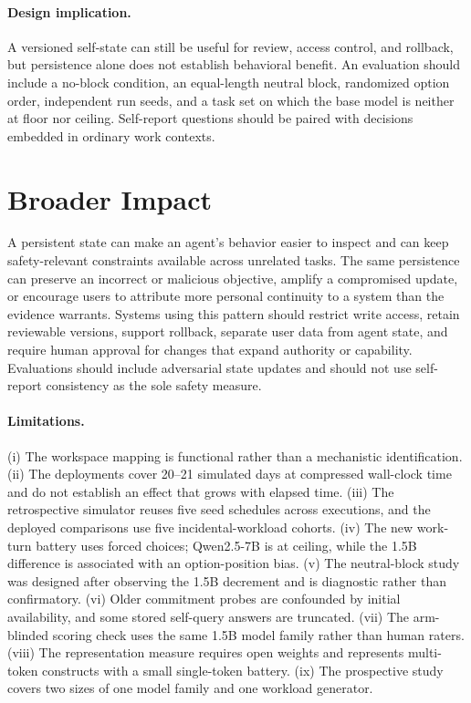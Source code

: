 \documentclass[11pt]{article}
\begin{document}
\paragraph{Design implication.} A versioned self-state can still be useful for review, access control, and rollback, but persistence alone does not establish behavioral benefit. An evaluation should include a no-block condition, an equal-length neutral block, randomized option order, independent run seeds, and a task set on which the base model is neither at floor nor ceiling. Self-report questions should be paired with decisions embedded in ordinary work contexts.

\section*{Broader Impact}
A persistent state can make an agent's behavior easier to inspect and can keep safety-relevant constraints available across unrelated tasks. The same persistence can preserve an incorrect or malicious objective, amplify a compromised update, or encourage users to attribute more personal continuity to a system than the evidence warrants. Systems using this pattern should restrict write access, retain reviewable versions, support rollback, separate user data from agent state, and require human approval for changes that expand authority or capability. Evaluations should include adversarial state updates and should not use self-report consistency as the sole safety measure.

\paragraph{Limitations.} (i) The workspace mapping is functional rather than a mechanistic identification. (ii) The deployments cover 20--21 simulated days at compressed wall-clock time and do not establish an effect that grows with elapsed time. (iii) The retrospective simulator reuses five seed schedules across executions, and the deployed comparisons use five incidental-workload cohorts. (iv) The new work-turn battery uses forced choices; Qwen2.5-7B is at ceiling, while the 1.5B difference is associated with an option-position bias. (v) The neutral-block study was designed after observing the 1.5B decrement and is diagnostic rather than confirmatory. (vi) Older commitment probes are confounded by initial availability, and some stored self-query answers are truncated. (vii) The arm-blinded scoring check uses the same 1.5B model family rather than human raters. (viii) The representation measure requires open weights and represents multi-token constructs with a small single-token battery. (ix) The prospective study covers two sizes of one model family and one workload generator.
\end{document}
